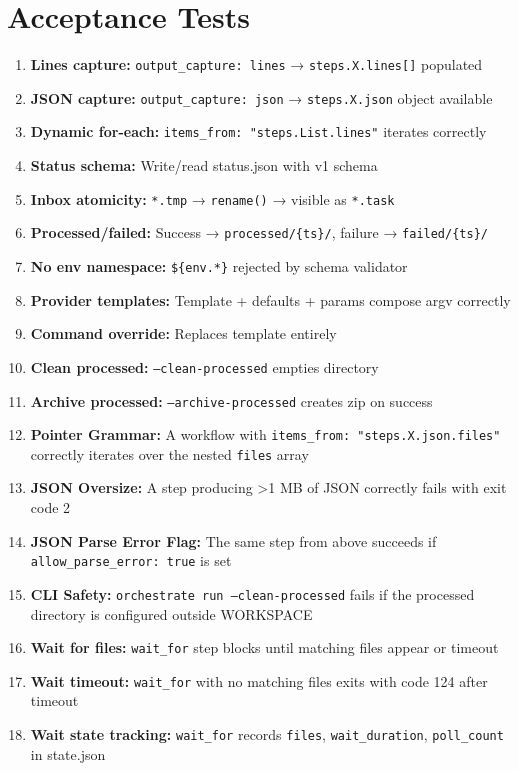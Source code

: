 \documentclass[11pt,a4paper]{article}
\begin{document}
\section{Acceptance Tests}

\begin{enumerate}
    \item \textbf{Lines capture:} \texttt{output\_capture: lines} → \texttt{steps.X.lines[]} populated
    \item \textbf{JSON capture:} \texttt{output\_capture: json} → \texttt{steps.X.json} object available
    \item \textbf{Dynamic for-each:} \texttt{items\_from: "steps.List.lines"} iterates correctly
    \item \textbf{Status schema:} Write/read status.json with v1 schema
    \item \textbf{Inbox atomicity:} \texttt{*.tmp} → \texttt{rename()} → visible as \texttt{*.task}
    \item \textbf{Processed/failed:} Success → \texttt{processed/\{ts\}/}, failure → \texttt{failed/\{ts\}/}
    \item \textbf{No env namespace:} \texttt{\$\{env.*\}} rejected by schema validator
    \item \textbf{Provider templates:} Template + defaults + params compose argv correctly
    \item \textbf{Command override:} Replaces template entirely
    \item \textbf{Clean processed:} \texttt{--clean-processed} empties directory
    \item \textbf{Archive processed:} \texttt{--archive-processed} creates zip on success
    \item \textbf{Pointer Grammar:} A workflow with \texttt{items\_from: "steps.X.json.files"} correctly iterates over the nested \texttt{files} array
    \item \textbf{JSON Oversize:} A step producing >1 MB of JSON correctly fails with exit code 2
    \item \textbf{JSON Parse Error Flag:} The same step from above succeeds if \texttt{allow\_parse\_error: true} is set
    \item \textbf{CLI Safety:} \texttt{orchestrate run --clean-processed} fails if the processed directory is configured outside WORKSPACE
    \item \textbf{Wait for files:} \texttt{wait\_for} step blocks until matching files appear or timeout
    \item \textbf{Wait timeout:} \texttt{wait\_for} with no matching files exits with code 124 after timeout
    \item \textbf{Wait state tracking:} \texttt{wait\_for} records \texttt{files}, \texttt{wait\_duration}, \texttt{poll\_count} in state.json
\end{enumerate}
\end{document}

